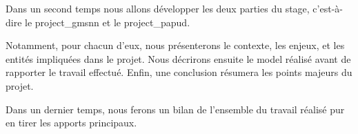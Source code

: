 Dans un second temps nous allons développer les deux parties du stage, c'est-à-dire le \gls{project_gmsnn} et le \gls{project_papud}.

Notamment, pour chacun d'eux, nous présenterons le contexte, les enjeux, et les entités impliquées dans le projet. Nous décrirons ensuite le \gls{model} réalisé avant de rapporter le travail effectué. Enfin, une conclusion résumera les points majeurs du projet.

Dans un dernier temps, nous ferons un bilan de l'ensemble du travail réalisé pur en tirer les apports principaux.




